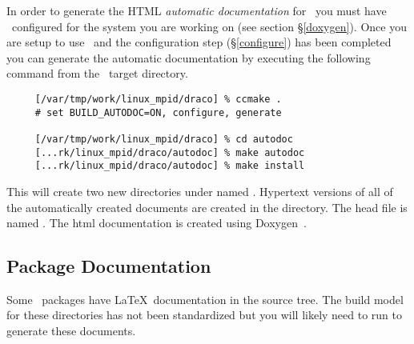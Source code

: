 In order to generate the HTML 
\emph{automatic documentation} for \draco\ you must have
\doxygen\ configured for the system you are working on (see section
\S\ref{doxygen}).  Once you are setup to use \doxygen\ and the
configuration step (\S\ref{configure}) has been completed you can
generate the automatic documentation by executing the following
command from the \draco\ target directory.

\footnotesize
\begin{verbatim}
     [/var/tmp/work/linux_mpid/draco] % ccmake .
     # set BUILD_AUTODOC=ON, configure, generate

     [/var/tmp/work/linux_mpid/draco] % cd autodoc
     [...rk/linux_mpid/draco/autodoc] % make autodoc
     [...rk/linux_mpid/draco/autodoc] % make install
\end{verbatim}
\normalsize

This will create two new directories under
 named .
Hypertext versions of all of the automatically created documents are
created in the  directory.  The head file is named
.  The html documentation is created using
Doxygen~\cite{doxygen}.


\subsection{Package Documentation}

Some \draco\ packages have \LaTeX\ documentation in the source tree.
The build model for these directories has not been standardized but
you will likely need to run  to generate these
documents.  

